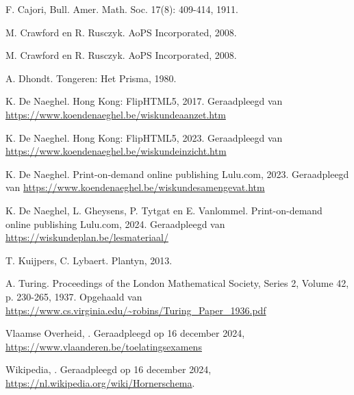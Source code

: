 \documentclass{ximera}
\begin{document}
{}
{}
\begin{thebibliography}{99}

F. Cajori,  Bull. Amer. Math. Soc. 17(8): 409-414, 1911.

M. Crawford en R. Rusczyk.  AoPS Incorporated, 2008.

M. Crawford en R. Rusczyk.  AoPS Incorporated, 2008.

A. Dhondt.  Tongeren: Het Prisma, 1980.

K. De Naeghel.  Hong Kong: FlipHTML5, 2017. Geraadpleegd van \url{https://www.koendenaeghel.be/wiskundeaanzet.htm}

K. De Naeghel.  Hong Kong: FlipHTML5, 2023. Geraadpleegd van \url{https://www.koendenaeghel.be/wiskundeinzicht.htm}

K. De Naeghel.  Print-on-demand online publishing Lulu.com, 2023. Geraadpleegd van \url{https://www.koendenaeghel.be/wiskundesamengevat.htm} 

K. De Naeghel, L. Gheysens, P. Tytgat en E. Vanlommel.  Print-on-demand online publishing Lulu.com, 2024. Geraadpleegd van \url{https://wiskundeplan.be/lesmateriaal/}

T. Kuijpers, C. Lybaert.  Plantyn, 2013.

A. Turing.  Proceedings of the London Mathematical Society, Series 2, Volume 42, p. 230-265, 1937. 
Opgehaald van \url{https://www.cs.virginia.edu/~robins/Turing_Paper_1936.pdf}

Vlaamse Overheid, . Geraadpleegd op 16 december 2024, \url{https://www.vlaanderen.be/toelatingsexamens}

Wikipedia, . Geraadpleegd op 16 december 2024, \url{https://nl.wikipedia.org/wiki/Hornerschema}.

\end{thebibliography}
\end{document}
